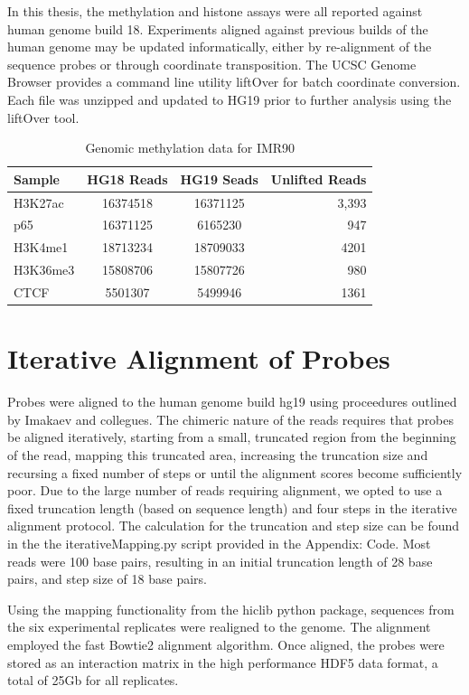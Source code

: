 \documentclass[phd,tocprelim]{cornell}
\begin{document}
In this thesis, the methylation and histone assays were all reported against human genome build 18.  Experiments aligned
against previous builds of the human genome may be updated informatically, either by re-alignment of the
sequence probes or through coordinate transposition.  The UCSC Genome Browser provides a command line utility liftOver for
batch coordinate conversion.  Each file was unzipped and updated to HG19 prior to further analysis using the liftOver tool.

\begin{table}
  \centering
  \begin{tabular}{lccr}
    \hline
    Sample & HG18 Reads & HG19 Seads & Unlifted Reads \\ \hline
    H3K27ac & 16374518 & 16371125 & 3,393 \\
    p65 & 16371125 & 6165230 & 947 \\
    H3K4me1 & 18713234 & 18709033 & 4201 \\
    H3K36me3 & 15808706 & 15807726 & 980 \\
    CTCF & 5501307 & 5499946 & 1361 \\
    \hline
  \end{tabular}
  \caption{Genomic methylation data for IMR90}
\end{table}

\chapter{Iterative Alignment of Probes}

Probes were aligned to the human genome build hg19 using proceedures outlined by
Imakaev and collegues\cite{imakaev2012}.  The chimeric nature of the reads
requires that probes be aligned iteratively, starting from a small, truncated
region from the beginning of the read, mapping this truncated area, increasing
the truncation size and recursing a fixed number of steps or until the alignment
scores become sufficiently poor.  Due to the large number of reads requiring
alignment, we opted to use a fixed truncation length (based on sequence length)
and four steps in the iterative alignment protocol.  The calculation
for the truncation and step size can be found in the the iterativeMapping.py
script provided in the Appendix: Code.  Most reads were 100 base pairs, resulting
in an initial truncation length of 28 base pairs, and step size of 18 base pairs.

Using the mapping functionality from the hiclib python package\cite{imakaev2012},
sequences from the six experimental replicates were realigned to the genome.  The
alignment employed the fast Bowtie2 alignment algorithm\cite{langmead2012}.  Once
aligned, the probes were stored as an interaction matrix in the high performance
HDF5\cite{hdf5} data format, a total of 25Gb for all replicates.
\end{document}
